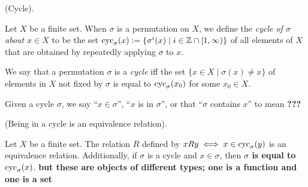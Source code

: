 \begin{defn}
    (Cycle).

    Let $X$ be a finite set. When $\sigma$ is a permutation on $X$, we define the \textit{cycle of $\sigma$ about $x \in X$} to be the set ${\text{cyc}_\sigma(x) := \{ \sigma^i(x) \mid i \in \mathbb{Z} \cap [1, \infty) \}}$ of all elements of $X$ that are obtained by repeatedly applying $\sigma$ to $x$.

    We say that a permutation $\sigma$ is a \textit{cycle} iff the set $\{x \in X \mid \sigma(x) \neq x\}$ of elements in $X$ not fixed by $\sigma$ is equal to $\text{cyc}_\sigma(x_0)$ for some $x_0 \in X$.

    Given a cycle $\sigma$, we say ``$x \in \sigma$'', ``$x$ is in $\sigma$'', or that ``$\sigma$ contains $x$'' to mean \textbf{???}
\end{defn}

\begin{lemma}
    (Being in a cycle is an equivalence relation).

    Let $X$ be a finite set. The relation $R$ defined by $xRy \iff x \in \text{cyc}_\sigma(y)$ is an equivalence relation. Additionally, if $\sigma$ is a cycle and $x \in \sigma$, then \textbf{$\sigma$ is equal to $\text{cyc}_\sigma(x)$}. \textbf{but these are objects of different types; one is a function and one is a set} 
\end{lemma}

